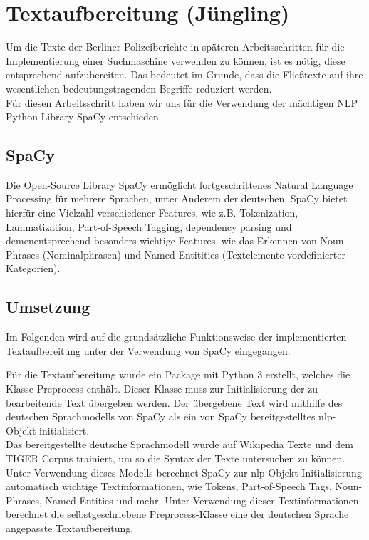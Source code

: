 \chapter{Textaufbereitung \small(Jüngling)}
\label{ch:Textaufbereitung}

Um die Texte der Berliner Polizeiberichte in späteren Arbeitsschritten für die Implementierung einer Suchmaschine verwenden zu können, ist es nötig, diese entsprechend aufzubereiten. Das bedeutet im Grunde, dass die Fließtexte auf ihre wesentlichen bedeutungstragenden Begriffe reduziert werden. 
\\Für diesen Arbeitsschritt haben wir uns für die Verwendung der mächtigen NLP Python Library SpaCy entschieden. 

\section{SpaCy}
Die Open-Source Library SpaCy ermöglicht fortgeschrittenes Natural Language Processing für mehrere Sprachen, unter Anderem der deutschen. SpaCy bietet hierfür eine Vielzahl verschiedener Features, wie z.B. Tokenization, Lammatization, Part-of-Speech Tagging, dependency parsing und demenentsprechend besonders wichtige Features, wie das Erkennen von Noun-Phrases (Nominalphrasen) und Named-Entitities (Textelemente vordefinierter Kategorien). 

\section{Umsetzung}
Im Folgenden wird auf die grundsätzliche Funktionsweise der implementierten Textaufbereitung unter der Verwendung von SpaCy eingegangen.

Für die Textaufbereitung wurde ein Package mit Python 3 erstellt, welches die Klasse Preprocess enthält. Dieser Klasse muss zur Initialisierung der zu bearbeitende Text übergeben werden. Der übergebene Text wird mithilfe des deutschen Sprachmodells von SpaCy als ein von SpaCy bereitgestelltes nlp-Objekt initialisiert. 
\\Das bereitgestellte deutsche Sprachmodell wurde auf Wikipedia Texte und dem TIGER Corpus trainiert, um so die Syntax der Texte untersuchen zu können. Unter Verwendung dieses Modells berechnet SpaCy zur nlp-Objekt-Initialisierung automatisch wichtige Textinformationen, wie Tokens, Part-of-Speech Tags, Noun-Phrases, Named-Entities und mehr. Unter Verwendung dieser Textinformationen berechnet die selbstgeschriebene Preprocess-Klasse eine der deutschen Sprache angepasste Textaufbereitung.

